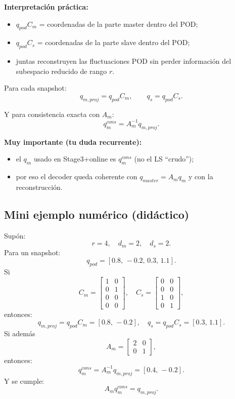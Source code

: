 \documentclass[11pt,a4paper]{article}
\begin{document}
\textbf{Interpretación práctica:}
\begin{itemize}[leftmargin=1.5em]
\item $q_{pod}C_m$ = coordenadas de la parte master dentro del POD;
\item $q_{pod}C_s$ = coordenadas de la parte slave dentro del POD;
\item juntas reconstruyen las fluctuaciones POD sin perder información del subespacio reducido de rango $r$.
\end{itemize}

Para cada snapshot:
\[
q_{m,proj}=q_{pod}C_m,\qquad q_s=q_{pod}C_s.
\]

Y para consistencia exacta con $A_m$:
\[
q_m^{cons} = A_m^{-1}q_{m,proj}.
\]

\textbf{Muy importante (tu duda recurrente):}
\begin{itemize}[leftmargin=1.5em]
\item el $q_m$ usado en Stage3+online es $q_m^{cons}$ (no el LS ``crudo'');
\item por eso el decoder queda coherente con
\(
q_{master}=A_m q_m
\)
y con la reconstrucción.
\end{itemize}

\subsection{Mini ejemplo numérico (didáctico)}
Supón:
\[
r=4,\quad d_m=2,\quad d_s=2.
\]
Para un snapshot:
\[
q_{pod}=[0.8,\,-0.2,\,0.3,\,1.1].
\]
Si
\[
C_m=
\begin{bmatrix}
1&0\\
0&1\\
0&0\\
0&0
\end{bmatrix},
\quad
C_s=
\begin{bmatrix}
0&0\\
0&0\\
1&0\\
0&1
\end{bmatrix},
\]
entonces:
\[
q_{m,proj}=q_{pod}C_m=[0.8,\,-0.2],\quad
q_s=q_{pod}C_s=[0.3,\,1.1].
\]
Si además
\[
A_m=
\begin{bmatrix}
2&0\\
0&1
\end{bmatrix},
\]
entonces:
\[
q_m^{cons}=A_m^{-1}q_{m,proj}=[0.4,\,-0.2].
\]
Y se cumple:
\[
A_m q_m^{cons}=q_{m,proj}.
\]
\end{document}
